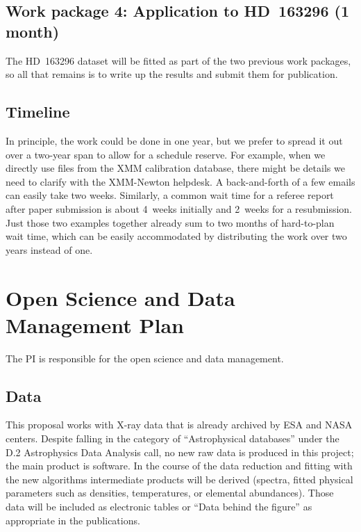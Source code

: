 \documentclass[fleqn,12pt,onecolumn]{SelfArx} %
\begin{document}
\subsection{Work package 4: Application to HD~163296 (1 month)}

The HD~163296 dataset will be fitted as part of the two previous work packages, so all that remains is to write up the results and submit them for publication.



\subsection{Timeline}
In principle, the work could be done in one year, but we prefer to spread it out over a two-year span to allow for a schedule reserve. For example, when we directly use files from the XMM calibration database, there might be details we need to clarify with the XMM-Newton helpdesk. A back-and-forth of a few emails can easily take two weeks. Similarly, a common wait time for a referee report after paper submission is about 4~weeks initially and 2~weeks for a resubmission. Just those two examples together already sum to two months of hard-to-plan wait time, which can be easily accommodated by distributing the work over two years instead of one.


\section{Open Science and Data Management Plan}
The PI is responsible for the open science and data management.

\subsection{Data}
This proposal works with X-ray data that is already archived by ESA and NASA centers. Despite falling in the category of ``Astrophysical databases'' under the D.2 Astrophysics Data Analysis call, no new raw data is produced in this project; the main product is software. In the course of the data reduction and fitting with the new algorithms intermediate products will be derived (spectra, fitted physical parameters such as densities, temperatures, or elemental abundances). Those data will be included as electronic tables or ``Data behind the figure'' as appropriate in the publications.
\end{document}
